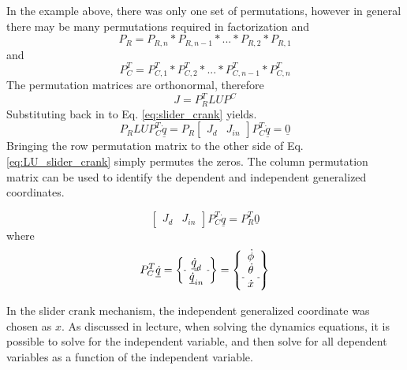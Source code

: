 \documentclass[12pt]{article}   %
\begin{document}
In the example above, there was only one set of permutations, however in general there may be many permutations required in factorization and
\begin{equation}
P_R=P_{R,n} * P_{R,n-1} * ... * P_{R,2} * P_{R,1}
\end{equation}
and
\begin{equation}
P_C^T=P_{C,1}^T * P_{C,2}^T * ... * P_{C,n-1}^T * P_{C,n}^T
\end{equation}
The permutation matrices are orthonormal, therefore
\begin{equation}
J=P_R^TLUP^C
\end{equation}
Substituting back in to Eq. \ref{eq:slider_crank} yields.
\begin{equation}
P_RLUP_C^T\underline{\dot{q}}=P_R\begin{bmatrix}J_d & J_{in}\end{bmatrix}P_C^T\underline{\dot{q}}=\underline{0}
\label{eq:LU_slider_crank}
\end{equation}
Bringing the row permutation matrix to the other side of Eq. \ref{eq:LU_slider_crank} simply permutes the zeros. The column permutation matrix can be used to identify the dependent and independent generalized coordinates.

\begin{equation}
\begin{bmatrix}
J_d & J_{in}
\end{bmatrix}P_C^T\underline{\dot{q}}=P_R^T\underline{0}
\end{equation}
where
\begin{equation}
P_C^T\underline{\dot{q}}=
\left\{
\begin{array}{c}

\underline{\dot{q}}_{d}\\
\hdashline
\underline{\dot{q}}_{in}
\end{array}\right\}
=\left\{\begin{array}{c}

\dot{\phi}\\
\dot{\theta}\\
\hdashline
\dot{x}
\end{array}\right\}
\end{equation}

In the slider crank mechanism, the independent generalized coordinate was chosen as $x$. As discussed in lecture, when solving the dynamics equations, it is possible to solve for the independent variable, and then solve for all dependent variables as a function of the independent variable. 
\end{document}
